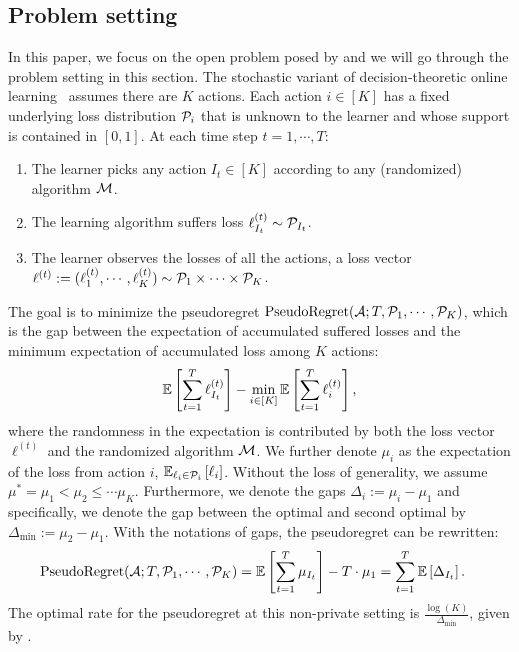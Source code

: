\subsection{Problem setting}
In this paper, we focus on the open problem posed by \citet{hu2024open} and we will go through the problem setting in this section.
The stochastic variant of decision-theoretic online learning~\citep{freund1997decision} assumes there are $K$ actions.
Each action $i\in [K]$ has a fixed underlying loss distribution $\mathcal{P}_i$ that is unknown to the learner and whose support is contained in $[0,1]$.
At each time step $t=1, \cdots, T$:
\begin{enumerate}[leftmargin=*,nosep]
\item The learner picks any action $I_t\in [K]$ according to any (randomized) algorithm $\mathcal{M}$.
\item The learning algorithm suffers loss $\ell_{I_t}^{(t)}\sim \mathcal{P}_{I_t}$.
\item The learner observes the losses of all the actions, a loss vector $\ell^{(t)}:=(\ell^{(t)}_1, \cdots, \ell^{(t)}_K)\sim \mathcal{P}_1\times \cdots \times \mathcal{P}_K$.
\end{enumerate}
The goal is to minimize the pseudoregret $\mathrm{PseudoRegret}(\mathcal{A}; T, \mathcal{P}_1, \cdots, \mathcal{P}_K)$, which is the gap between the expectation of accumulated suffered losses and the minimum expectation of accumulated loss among $K$ actions:
$$
\mathbb{E}\left[\sum_{t=1}^T \ell_{I_t}^{(t)}\right] - \min_{i\in [K]}\mathbb{E}\left[\sum_{t=1}^T \ell_{i}^{(t)}\right],
$$
where the randomness in the expectation is contributed by both the loss vector $\ell^{(t)}$ and the randomized algorithm $\mathcal{M}$.
We further denote $\mu_i$ as the expectation of the loss from action $i$, $\mathbb{E}_{\ell_i\in \mathcal{P}_i}\left[\ell_{i}\right]$.
Without the loss of generality, we assume $\mu^* = \mu_1 < \mu_2\leq\cdots \mu_K$.
Furthermore, we denote the gaps $\Delta_i:=\mu_i - \mu_1$ and specifically, we denote the gap between the optimal and second optimal by $\Delta_{\min}:= \mu_2 - \mu_1$.
With the notations of gaps, the pseudoregret can be rewritten:
\begin{align}
\label{eq:regret}
\mathrm{PseudoRegret}(\mathcal{A}; T, \mathcal{P}_1, \cdots, \mathcal{P}_K) &= \mathbb{E}\left[\sum_{t=1}^T \mu_{I_t}\right] - T\cdot\mu_1 = \sum_{t=1}^T \mathbb{E}\left[\Delta_{I_t}\right].
\end{align}
The optimal rate for the pseudoregret at this non-private setting is $\frac{\log(K)}{\Delta_{\min}}$, given by \citet{kotlowski2018minimaxity,mourtada2019optimality}.

